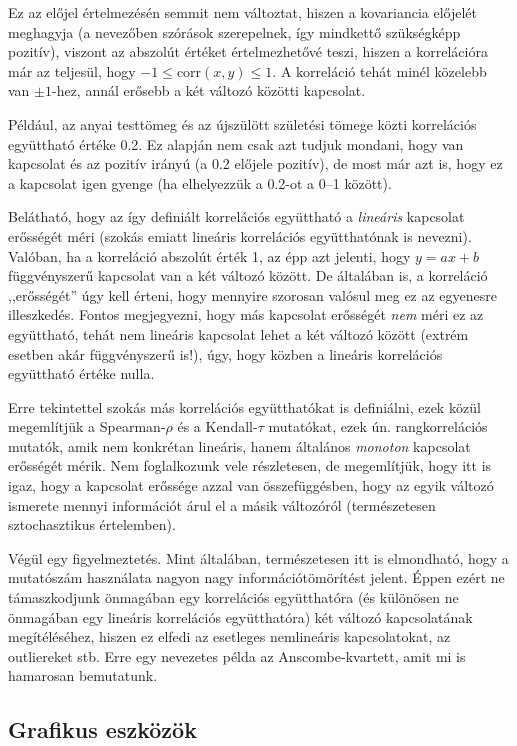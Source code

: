 \documentclass[]{book}
\begin{document}
Ez az előjel értelmezésén semmit nem változtat, hiszen a kovariancia előjelét meghagyja (a nevezőben szórások szerepelnek, így mindkettő szükségképp pozitív), viszont az abszolút értéket értelmezhetővé teszi, hiszen a korrelációra már az teljesül, hogy \(-1 \leq \mathrm{corr}\left(x,y\right) \leq 1\). A korreláció tehát minél közelebb van \(\pm 1\)-hez, annál erősebb a két változó közötti kapcsolat.

Például, az anyai testtömeg és az újszülött születési tömege közti korrelációs együttható értéke 0.2. Ez alapján nem csak azt tudjuk mondani, hogy van kapcsolat és az pozitív irányú (a 0.2 előjele pozitív), de most már azt is, hogy ez a kapcsolat igen gyenge (ha elhelyezzük a 0.2-ot a 0--1 között).

Belátható, hogy az így definiált korrelációs együttható a \emph{lineáris} kapcsolat erősségét méri (szokás emiatt lineáris korrelációs együtthatónak is nevezni). Valóban, ha a korreláció abszolút érték 1, az épp azt jelenti, hogy \(y=ax+b\) függvényszerű kapcsolat van a két változó között. De általában is, a korreláció ,,erősségét'' úgy kell érteni, hogy mennyire szorosan valósul meg ez az egyenesre illeszkedés. Fontos megjegyezni, hogy más kapcsolat erősségét \emph{nem} méri ez az együttható, tehát nem lineáris kapcsolat lehet a két változó között (extrém esetben akár függvényszerű is!), úgy, hogy közben a lineáris korrelációs együttható értéke nulla.

Erre tekintettel szokás más korrelációs együtthatókat is definiálni, ezek közül megemlítjük a Spearman-\(\rho\) és a Kendall-\(\tau\) mutatókat, ezek ún. rangkorrelációs mutatók, amik nem konkrétan lineáris, hanem általános \emph{monoton} kapcsolat erősségét mérik. Nem foglalkozunk vele részletesen, de megemlítjük, hogy itt is igaz, hogy a kapcsolat erőssége azzal van összefüggésben, hogy az egyik változó ismerete mennyi információt árul el a másik változóról (természetesen sztochasztikus értelemben).

Végül egy figyelmeztetés. Mint általában, természetesen itt is elmondható, hogy a mutatószám használata nagyon nagy információtömörítést jelent. Éppen ezért ne támaszkodjunk önmagában egy korrelációs együtthatóra (és különösen ne önmagában egy lineáris korrelációs együtthatóra) két változó kapcsolatának megítéléséhez, hiszen ez elfedi az esetleges nemlineáris kapcsolatokat, az outliereket stb. Erre egy nevezetes példa az Anscombe-kvartett, amit mi is hamarosan bemutatunk.

\hypertarget{deskriptivmennyketvaltvaltgrafikus}{%
\subsection{Grafikus eszközök}\label{deskriptivmennyketvaltvaltgrafikus}}
\end{document}
